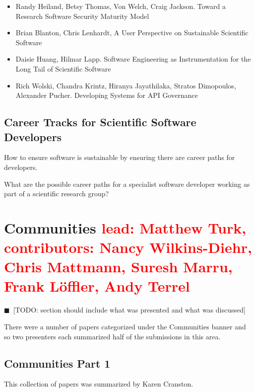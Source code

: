 \documentclass[11pt, oneside]{amsart}
\newcommand{\todo}[1]{{\color{blue}$\blacksquare$~\textsf{[TODO: #1]}}}
\newcommand{\note}[1]{ {\textcolor{red}    { #1 }}}
\begin{document}
\begin{itemize}

\item Randy Heiland, Betsy Thomas, Von Welch, Craig Jackson. Toward a
  Research Software Security Maturity Model \cite{Heiland_WSSSPE}

\item Brian Blanton, Chris Lenhardt, A User Perspective on Sustainable
  Scientific Software \cite{Blanton_WSSSPE}

\item Daisie Huang, Hilmar Lapp. Software Engineering as
  Instrumentation for the Long Tail of Scientific Software
  \cite{Huang_WSSSPE}

\item Rich Wolski, Chandra Krintz, Hiranya Jayathilaka, Stratos
  Dimopoulos, Alexander Pucher. Developing Systems for API Governance
  \cite{Wolski_WSSSPE}

\end{itemize}


\subsection{Career Tracks for Scientific Software Developers}

How to ensure software is sustainable by ensuring there are career
paths for developers.

What are the possible career paths for a specialist software developer working as part of a scientific research group?

\section{Communities \note{lead: Matthew Turk, contributors: Nancy Wilkins-Diehr, Chris Mattmann, Suresh Marru, Frank L\"{o}ffler, Andy Terrel}} \label{sec:community}


\todo{section should include what was presented and what was discussed}

There were a number of papers categorized under the Communities banner and so two presenters each summarized half of the submissions in this area.

\subsection{Communities Part 1}

This collection of papers was summarized by Karen Cranston.
\end{document}
